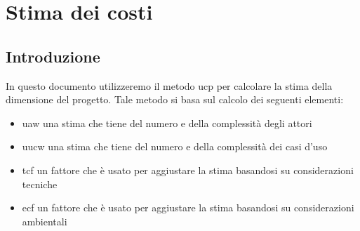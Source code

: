 \chapter{Stima dei costi}\label{cha:stima_costi}

\section{Introduzione}
In questo documento utilizzeremo il metodo \gls{ucp} per calcolare la stima della dimensione del progetto. Tale metodo si basa sul calcolo dei seguenti elementi:
\begin{itemize}
	\item \gls{uaw} una stima che tiene del numero e della complessità degli attori
	\item \gls{uucw} una stima che tiene del numero e della complessità dei casi d'uso
	\item \gls{tcf} un fattore che è usato per aggiustare la stima basandosi su considerazioni tecniche
	\item \gls{ecf} un fattore che è usato per aggiustare la stima basandosi su considerazioni ambientali
\end{itemize}

